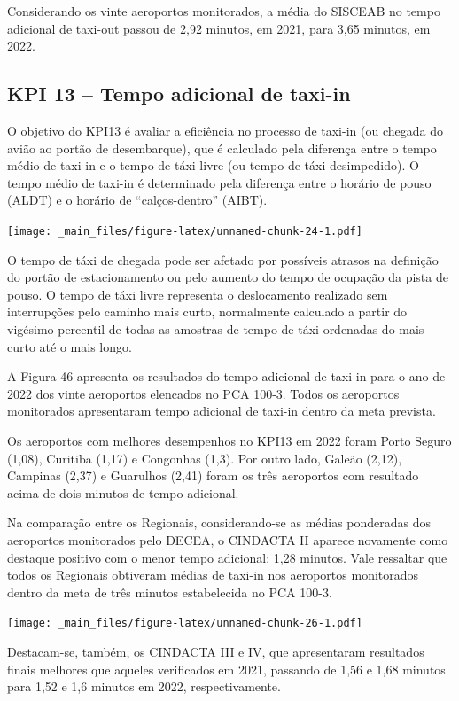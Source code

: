 \documentclass[
]{book}
\begin{document}
Considerando os vinte aeroportos monitorados, a média do SISCEAB no tempo adicional de taxi-out passou de 2,92 minutos, em 2021, para 3,65 minutos, em 2022.

\hypertarget{kpi-13-tempo-adicional-de-taxi-in}{%
\subsection{KPI 13 -- Tempo adicional de taxi-in}\label{kpi-13-tempo-adicional-de-taxi-in}}

O objetivo do KPI13 é avaliar a eficiência no processo de taxi-in (ou chegada do avião ao portão de desembarque), que é calculado pela diferença entre o tempo médio de taxi-in e o tempo de táxi livre (ou tempo de táxi desimpedido). O tempo médio de taxi-in é determinado pela diferença entre o horário de pouso (ALDT) e o horário de ``calços-dentro'' (AIBT).

\texttt{[image: \_main\_files/figure-latex/unnamed-chunk-24-1.pdf]}

O tempo de táxi de chegada pode ser afetado por possíveis atrasos na definição do portão de estacionamento ou pelo aumento do tempo de ocupação da pista de pouso. O tempo de táxi livre representa o deslocamento realizado sem interrupções pelo caminho mais curto, normalmente calculado a partir do vigésimo percentil de todas as amostras de tempo de táxi ordenadas do mais curto até o mais longo.

A Figura 46 apresenta os resultados do tempo adicional de taxi-in para o ano de 2022 dos vinte aeroportos elencados no PCA 100-3. Todos os aeroportos monitorados apresentaram tempo adicional de taxi-in dentro da meta prevista.

Os aeroportos com melhores desempenhos no KPI13 em 2022 foram Porto Seguro (1,08), Curitiba (1,17) e Congonhas (1,3). Por outro lado, Galeão (2,12), Campinas (2,37) e Guarulhos (2,41) foram os três aeroportos com resultado acima de dois minutos de tempo adicional.

Na comparação entre os Regionais, considerando-se as médias ponderadas dos aeroportos monitorados pelo DECEA, o CINDACTA II aparece novamente como destaque positivo com o menor tempo adicional: 1,28 minutos. Vale ressaltar que todos os Regionais obtiveram médias de taxi-in nos aeroportos monitorados dentro da meta de três minutos estabelecida no PCA 100-3.

\texttt{[image: \_main\_files/figure-latex/unnamed-chunk-26-1.pdf]}

Destacam-se, também, os CINDACTA III e IV, que apresentaram resultados finais melhores que aqueles verificados em 2021, passando de 1,56 e 1,68 minutos para 1,52 e 1,6 minutos em 2022, respectivamente.
\end{document}
